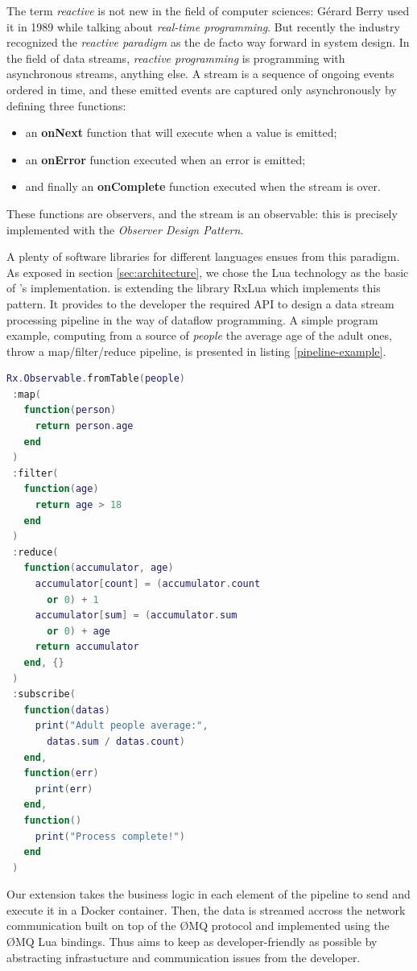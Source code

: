 The term \textit{reactive} is not new in the field of computer sciences: Gérard Berry used it in 1989 while talking about \textit{real-time programming}\cite{berry:realtime_programming}.
But recently the industry recognized the \textit{reactive paradigm} as the de facto way forward in system design\cite{malawski:why_reactive}.
In the field of data streams, \textit{reactive programming} is programming with asynchronous streams, anything else.
A stream is a sequence of ongoing events ordered in time, and these emitted events are captured only asynchronously by defining three functions:

\begin{itemize}
  \item an \textbf{onNext} function that will execute when a value is emitted;
  \item an \textbf{onError} function executed when an error is emitted;
  \item and finally an \textbf{onComplete} function executed when the stream is over.
\end{itemize}

These functions are observers, and the stream is an observable: this is precisely implemented with the \textit{Observer Design Pattern}\cite{szallies_using_1997}.

A plenty of software libraries for different languages ensues from this paradigm\cite{reactive_streams}\cite{github:reactive_streams}.
As exposed in section \ref{sec:architecture}, we chose the Lua technology as the basic of \SYS's implementation.
\SYS is extending the library RxLua\cite{github:rxlua} which implements this pattern.
It provides to the developer the required API to design a data stream processing pipeline in the way of dataflow programming\cite{uustalu_essence_2005}.
A simple program example, computing from a source of \textit{people} the average age of the adult ones, throw a map/filter/reduce pipeline, is presented in listing \ref{pipeline-example}.


\begin{minipage}{\linewidth}
\begin{lstlisting}[language=LUA,caption={Process pipeline example, using the library RxLua},label=pipeline-example]
Rx.Observable.fromTable(people)
 :map(
   function(person)
     return person.age
   end
 )
 :filter(
   function(age)
     return age > 18
   end
 )
 :reduce(
   function(accumulator, age)
     accumulator[count] = (accumulator.count
       or 0) + 1
     accumulator[sum] = (accumulator.sum
       or 0) + age
     return accumulator
   end, {}
 )
 :subscribe(
   function(datas)
     print("Adult people average:",
       datas.sum / datas.count)
   end,
   function(err)
     print(err)
   end,
   function()
     print("Process complete!")
   end
 )
\end{lstlisting}
\end{minipage}


Our extension takes the business logic in each element of the pipeline to send and execute it in a Docker container.
Then, the data is streamed accross the network communication built on top of the ØMQ protocol and implemented using the ØMQ Lua bindings\cite{github:lzmq}.
Thus \SYS aims to keep as developer-friendly as possible by abstracting infrastucture and communication issues from the developer.
